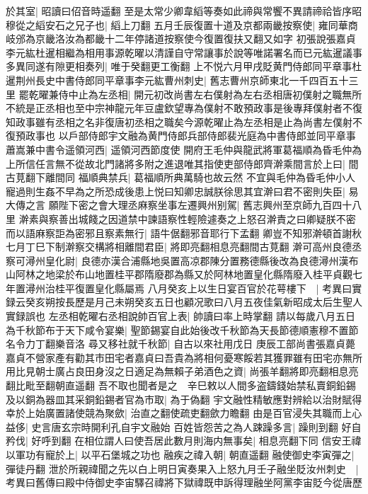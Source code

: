 於其室|{
	昭讀曰佋音時遥翻}
至是太常少卿韋縚等奏如此禘與常饗不異請禘祫皆序昭穆從之縚安石之兄子也|{
	縚上刀翻}
五月壬辰復置十道及京都兩畿按察使|{
	雍同華商岐邠為京畿洛汝為都畿十二年停諸道按察使今復置復扶又翻又如字}
初張說張嘉貞李元紘杜暹相繼為相用事源乾曜以清謹自守常讓事於說等唯諾署名而已元紘暹議事多異同遂有隙更相奏列|{
	唯于癸翻更工衡翻}
上不悦六月甲戌貶黄門侍郎同平章事杜暹荆州長史中書侍郎同平章事李元紘曹州刺史|{
	舊志曹州京師東北一千四百五十三里}
罷乾曜兼侍中止為左丞相|{
	開元初改尚書左右僕射為左右丞相唐初僕射之職無所不統是正丞相也至中宗神龍元年豆盧欽望專為僕射不敢預政事是後專拜僕射者不復知政事雖有丞相之名非復唐初丞相之職矣今源乾曜止為左丞相是止為尚書左僕射不復預政事也}
以戶部侍郎宇文融為黄門侍郎兵部侍郎裴光庭為中書侍郎並同平章事蕭嵩兼中書令遥領河西|{
	遥領河西節度使}
開府王毛仲與龍武將軍葛福順為昏毛仲為上所信任言無不從故北門諸將多附之進退唯其指使吏部侍郎齊澣乘間言於上曰|{
	間古莧翻下離間同}
福順典禁兵|{
	葛福順所典萬騎也故云然}
不宜與毛仲為昏毛仲小人寵過則生姦不早為之所恐成後患上悦曰知卿忠誠朕徐思其宜澣曰君不密則失臣|{
	易大傳之言}
願陛下密之會大理丞麻察坐事左遷興州别駕|{
	舊志興州至京師九百四十八里}
澣素與察善出城餞之因道禁中諫語察性輕險遽奏之上怒召澣責之曰卿疑朕不密而以語麻察詎為密邪且察素無行|{
	語牛倨翻邪音耶行下孟翻}
卿豈不知邪澣頓首謝秋七月丁巳下制澣察交構將相離間君臣|{
	將即亮翻相息亮翻間古莧翻}
澣可高州良德丞察可潯州皇化尉|{
	良德亦漢合浦縣地吳置高凉郡陳分置務德縣後改為良德潯州漢布山阿林之地梁於布山地置桂平郡隋廢郡為縣又於阿林地置皇化縣隋廢入桂平貞觀七年置潯州治桂平復置皇化縣屬焉}
八月癸亥上以生日宴百官於花萼樓下　|{
	考異曰實録云癸亥朔按長歷是月己未朔癸亥五日也顧况歌曰八月五夜佳氣新昭成太后生聖人實録誤也}
左丞相乾曜右丞相說帥百官上表|{
	帥讀曰率上時掌翻}
請以每歲八月五日為千秋節布于天下咸令宴樂|{
	聖節錫宴自此始後改千秋節為天長節德順憲穆不置節名令力丁翻樂音洛}
尋又移社就千秋節|{
	自古以來社用戊日}
庚辰工部尚書張嘉貞薨嘉貞不營家產有勸其市田宅者嘉貞曰吾貴為將相何憂寒餒若其獲罪雖有田宅亦無所用比見朝士廣占良田身沒之日適足為無賴子弟酒色之資|{
	尚張羊翻將即亮翻相息亮翻比毗至翻朝直遥翻}
吾不取也聞者是之　辛巳敕以人間多盗鑄錢始禁私賣銅鉛錫及以銅為器皿其采銅鉛錫者官為市取|{
	為于偽翻}
宇文融性精敏應對辨給以治財賦得幸於上始廣置諸使競為聚歛|{
	治直之翻使疏吏翻歛力瞻翻}
由是百官浸失其職而上心益侈|{
	史言唐玄宗時開利孔自宇文融始}
百姓皆怨苦之為人踈躁多言|{
	躁則到翻}
好自矜伐|{
	好呼到翻}
在相位謂人曰使吾居此數月則海内無事矣|{
	相息亮翻下同}
信安王禕以軍功有寵於上|{
	以平石堡城之功也}
融疾之禕入朝|{
	朝直遥翻}
融使御史李寅彈之|{
	彈徒丹翻}
泄於所親禕聞之先以白上明日寅奏果入上怒九月壬子融坐貶汝州刺史　|{
	考異曰舊傳曰殿中侍御史李宙驛召禕將下獄禕既申訴得理融坐阿黨李宙貶今從唐歷}
